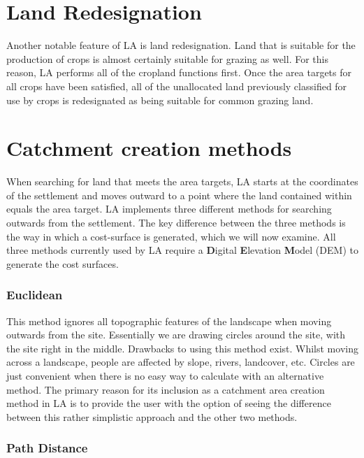 \section{Land Redesignation}
Another notable feature of LA is land redesignation.  Land that is suitable for the production of crops is almost certainly suitable for grazing as well.  For this reason, LA performs all of the cropland functions first.  Once the area targets for all crops have been satisfied, all of the unallocated land previously classified for use by crops is redesignated as being suitable for common grazing land. 

\section{Catchment creation methods} 

When searching for land that meets the area targets, LA starts at
the coordinates of the settlement and moves outward to a point where the land
contained within equals the area target.  LA implements three
different methods for searching outwards from the settlement.  The key
difference between the three methods is the way in which a cost-surface is
generated, which we will now examine.  All three methods currently used by LA
require a \textbf{D}igital \textbf{E}levation \textbf{M}odel (DEM) to generate
the cost surfaces.


  \subsubsection{Euclidean} \label{subsection:Euclidean} 
  
  This method ignores all topographic features of the landscape when moving
  outwards from the site.  Essentially we are drawing circles around the site,
  with the site right in the middle.  Drawbacks to using this method exist.
  Whilst moving across a landscape, people are affected by slope, rivers,
  landcover, etc.  Circles are just convenient when there is no easy way to
  calculate with an alternative method.  The primary reason for its inclusion
  as a catchment area creation method in LA is to provide the user
  with the option of seeing the difference between this rather simplistic
  approach and the other two methods.

  \subsubsection{Path Distance}
  
